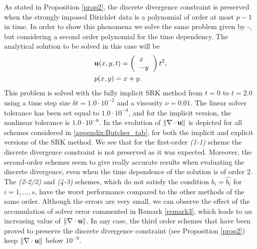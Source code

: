 As stated in Proposition \ref{prop2}, the discrete divergence constraint is preserved when the strongly imposed Dirichlet data is a polynomial of order at most $p-1$ in time. In order to show this phenomena we solve the same problem given by -, but considering a second order polynomial for the time dependency. The analytical solution to be solved in this case will be
\begin{align*}
&\u(x,y,t) = \left( \begin{tabular}{l}
$x$\\
$-y$
\end{tabular}\right)t^2,\\
&p(x,y) = x+y.
\end{align*}
This problem is solved with the fully implicit SRK method from $t=0$ to {$t=2.0$} using a time step size { $\delta t=1.0\cdot10^{-2}$} and a viscosity $\nu=0.01$. { The linear solver tolerance has been set equal to $1.0\cdot10^{-8}$, and for the implicit version, the nonlinear tolerance is $1.0\cdot10^{-6}$}. In  the evolution of $\|\nabla \cdot {\bf u}\|$ is depicted for all schemes considered in \ref{appendix:Butcher_tab}, for both the implicit and explicit versions of the SRK method. We see that for the first-order \textit{(1-1)} scheme the discrete divergence constraint is not preserved as it was expected. Moreover, the second-order schemes seem to give really accurate results when evaluating the discrete divergence, even when the time dependence of the solution is of order 2. { The \textit{(2-2/2)} and \textit{(4-3)} schemes, which do not satisfy the condition $b_i=\hat{b_i}$ for $i=1,...,s$, have the worst performance compared to the other methods of the same order. Although the errors are very small, we can observe the effect of the accumulation of solver error commented in Remark \ref{remark3}, which leads to an increasing value of $\|\nabla \cdot {\bf u}\|$. In any case, the third order schemes that have been proved to preserve the discrete divergence constraint (see Proposition \ref{prop2}) keep $\|\nabla \cdot {\bf u}\|$ below $10^{-9}$.
}
